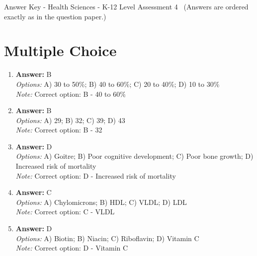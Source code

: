 \documentclass[12pt]{article}
\begin{document}
\begin{center}
Answer Key - Health Sciences - K-12 Level Assessment 4 \
\small (Answers are ordered exactly as in the question paper.)
\end{center}

\section*{Multiple Choice}
\begin{enumerate}[label=\arabic*.]
\item \textbf{Answer:} B
\\ \textit{Options:} A) 30 to 50\%; B) 40 to 60\%; C) 20 to 40\%; D) 10 to 30\%
\\ \textit{Note:} Correct option: B - 40 to 60\%
\item \textbf{Answer:} B
\\ \textit{Options:} A) 29; B) 32; C) 39; D) 43
\\ \textit{Note:} Correct option: B - 32
\item \textbf{Answer:} D
\\ \textit{Options:} A) Goitre; B) Poor cognitive development; C) Poor bone growth; D) Increased risk of mortality
\\ \textit{Note:} Correct option: D - Increased risk of mortality
\item \textbf{Answer:} C
\\ \textit{Options:} A) Chylomicrons; B) HDL; C) VLDL; D) LDL
\\ \textit{Note:} Correct option: C - VLDL
\item \textbf{Answer:} D
\\ \textit{Options:} A) Biotin; B) Niacin; C) Riboflavin; D) Vitamin C
\\ \textit{Note:} Correct option: D - Vitamin C
\end{enumerate}
\end{document}
